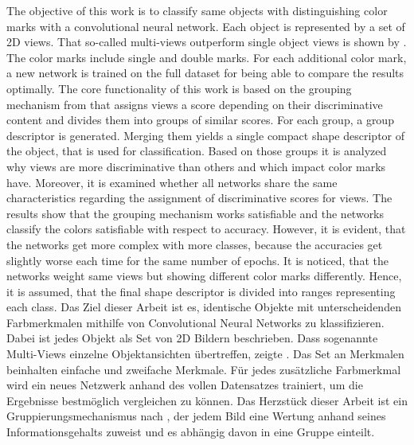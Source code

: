 \documentclass[a4paper,            	%
               12pt,               	%
               chapterprefix,      	%
               appendixprefix,		%
               headsepline,        	%
               twoside,				%
               draft=false]         %
               {scrbook}			%
\theoremstyle{defstyle}
\theoremstyle{bspstyle}
\begin{document}
\frontmatter			%
\maketitle				%
\begin{BaMaAbstract}{	%
	The objective of this work is to classify same objects with distinguishing color marks with a convolutional neural network.
	Each object is represented by a set of 2D views.
	That so-called multi-views outperform single object views is shown by \cite{Su:2015:MCN:2919332.2919750}.
	The color marks include single and double marks.
	For each additional color mark, a new network is trained on the full dataset for being able to compare the results optimally.
	The core functionality of this work is based on the grouping mechanism from \cite{Feng2018} that assigns views a score depending on their discriminative content and divides them into groups of similar scores.
	For each group, a group descriptor is generated.
	Merging them yields a single compact shape descriptor of the object, that is used for classification.
	Based on those groups it is analyzed why views are more discriminative than others and which impact color marks have.
	Moreover, it is examined whether all networks share the same characteristics regarding the assignment of discriminative scores for views.
	The results show that the grouping mechanism works satisfiable and the networks classify the colors satisfiable with respect to accuracy.
	However, it is evident, that the networks get more complex with more classes, because the accuracies get slightly worse each time for the same number of epochs.
	It is noticed, that the networks weight same views but showing different color marks differently.
	Hence, it is assumed, that the final shape descriptor is divided into ranges representing each class.
}{
	Das Ziel dieser Arbeit ist es, identische Objekte mit unterscheidenden Farbmerkmalen mithilfe von Convolutional Neural Networks zu klassifizieren.
	Dabei ist jedes Objekt als Set von 2D Bildern beschrieben.
	Dass sogenannte Multi-Views einzelne Objektansichten übertreffen, zeigte \cite{Su:2015:MCN:2919332.2919750}.
	Das Set an Merkmalen beinhalten einfache und zweifache Merkmale.
	Für jedes zusätzliche Farbmerkmal wird ein neues Netzwerk anhand des vollen Datensatzes trainiert, um die Ergebnisse bestmöglich vergleichen zu können.
	Das Herzstück dieser Arbeit ist ein Gruppierungsmechanismus nach \cite{Feng2018}, der jedem Bild eine Wertung anhand seines Informationsgehalts zuweist und es abhängig davon in eine Gruppe einteilt.
}
\end{BaMaAbstract}
\end{document}
